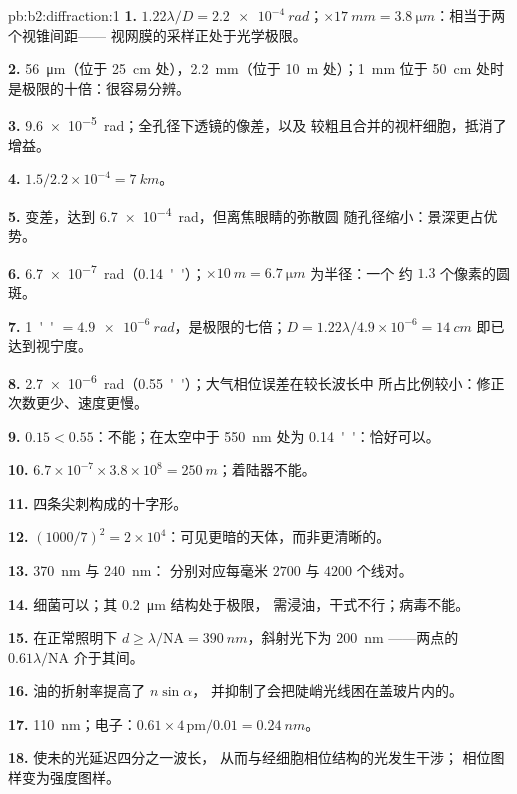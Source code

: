 \begin{solution}{pb:b2:diffraction:1}
\textbf{1.} $1.22\lambda/D = \qty{2.2e-4}{rad}$；$\times\qty{17}{mm} = \qty{3.8}{\micro m}$：相当于两个视锥间距——
视网膜的采样正处于光学极限。

\textbf{2.} \qty{56}{\micro m}（位于 \qty{25}{cm} 处），\qty{2.2}{mm}（位于 \qty{10}{m} 处）；\qty{1}{mm} 位于
\qty{50}{cm} 处时是极限的十倍：很容易分辨。

\textbf{3.} \qty{9.6e-5}{rad}；全孔径下透镜的像差，以及
较粗且合并的视杆细胞，抵消了增益。

\textbf{4.} $1.5/2.2 \times 10^{-4} = \qty{7}{km}$。

\textbf{5.} 变差，达到 \qty{6.7e-4}{rad}，但离焦眼睛的弥散圆
随孔径缩小：景深更占优势。

\textbf{6.} \qty{6.7e-7}{rad}（\qty{0.14}{''}）；$\times\qty{10}{m} = \qty{6.7}{\micro m}$ 为半径：一个
约 $1.3$ 个像素的圆斑。

\textbf{7.} \qty{1}{''} $= \qty{4.9e-6}{rad}$，是极限的七倍；$D = 1.22\lambda/4.9
\times 10^{-6} = \qty{14}{cm}$ 即已达到视宁度。

\textbf{8.} \qty{2.7e-6}{rad}（\qty{0.55}{''}）；大气相位误差在较长波长中
所占比例较小：修正次数更少、速度更慢。

\textbf{9.} $0.15 < 0.55$：不能；在太空中于 \qty{550}{nm} 处为 \qty{0.14}{''}：恰好可以。

\textbf{10.} $6.7 \times 10^{-7} \times 3.8 \times 10^8 = \qty{250}{m}$；着陆器不能。

\textbf{11.} 四条尖刺构成的十字形。

\textbf{12.} $(1000/7)^2 = 2 \times 10^4$：可见更暗的天体，而非更清晰的。

\textbf{13.} \qty{370}{nm} 与 \qty{240}{nm}：
分别对应每毫米 $2700$ 与 $4200$ 个线对。

\textbf{14.} 细菌可以；其 \qty{0.2}{\micro m} 结构处于极限，
需浸油，干式不行；病毒不能。

\textbf{15.} 在正常照明下 $d \ge \lambda/\mathrm{NA} = \qty{390}{nm}$，斜射光下为 \qty{200}{nm}
——两点的 $0.61\lambda/\mathrm{NA}$ 介于其间。

\textbf{16.} 油的折射率提高了 $n\sin\alpha$，
并抑制了会把陡峭光线困在盖玻片内的。

\textbf{17.} \qty{110}{nm}；电子：$0.61 \times 4\,\text{pm}/0.01 = \qty{0.24}{nm}$。

\textbf{18.} 使未的光延迟四分之一波长，
从而与经细胞相位结构的光发生干涉；
相位图样变为强度图样。


\end{solution}
